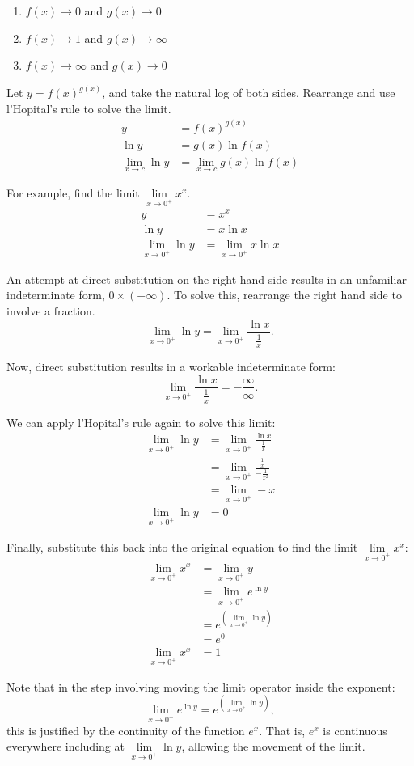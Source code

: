 \documentclass[12pt]{article}
\begin{document}
\begin{enumerate}
	\item $f(x) \to 0$ and $g(x) \to 0$
	\item $f(x) \to 1$ and $g(x) \to \infty$
	\item $f(x) \to \infty$ and $g(x) \to 0$
\end{enumerate}

Let $y = f(x)^{g(x)}$, and take the natural log of both sides. Rearrange and use l'Hopital's rule to solve the limit.
\begin{align*}
	y &= f(x)^{g(x)} \\
	\ln y &= g(x) \ln f(x) \\
	\lim_{x \to c} \ln y &= \lim_{x \to c} g(x) \ln f(x)
\end{align*}

\noindent For example, find the limit $\lim \limits_{x \to 0^+} x^x$.
\begin{align*}
	y &= x^x \\
	\ln y &= x \ln x \\
	\lim_{x \to 0^+} \ln y &= \lim_{x \to 0^+} x \ln x
\end{align*}

\noindent An attempt at direct substitution on the right hand side results in an unfamiliar indeterminate form, $0 \times (- \infty)$. To solve this, rearrange the right hand side to involve a fraction.
\[ \lim_{x \to 0^+} \ln y = \lim_{x \to 0^+} \frac{\ln x}{\frac{1}{x}}. \]

\noindent Now, direct substitution results in a workable indeterminate form:
\[ \lim_{x \to 0^+} \frac{\ln x}{\frac{1}{x}} = -\frac{\infty}{\infty}. \]

\noindent We can apply l'Hopital's rule again to solve this limit:
\begin{align*}
	\lim_{x \to 0^+} \ln y &= \lim_{x \to 0^+} \frac{\ln x}{\frac{1}{x}} \\[5pt]
	&= \lim_{x \to 0^+} \frac{\frac{1}{x}}{-\frac{1}{x^2}} \\[5pt]
	&= \lim_{x \to 0^+} -x \\
	\lim_{x \to 0^+} \ln y &= 0
\end{align*}

\noindent Finally, substitute this back into the original equation to find the limit $\lim \limits_{x \to 0^+} x^x$:
\begin{align*}
	\lim_{x \to 0^+} x^x &= \lim_{x \to 0^+} y \\
	&= \lim_{x \to 0^+} e^{\ln y} \\
	&= e^{\left( \lim \limits_{x \to 0^+} \ln y \right)} \\
	&= e^0 \\
	\lim_{x \to 0^+} x^x &= 1
\end{align*}

\noindent Note that in the step involving moving the limit operator inside the exponent:
\[ \lim_{x \to 0^+} e^{\ln y} = e^{\left( \lim \limits_{x \to 0^+} \ln y \right)}, \]
this is justified by the continuity of the function $e^x$. That is, $e^x$ is continuous everywhere including at $\lim \limits_{x \to 0^+} \ln y$, allowing the movement of the limit.
\end{document}
